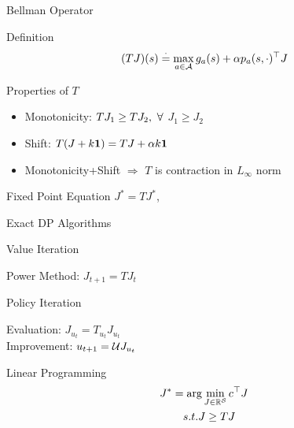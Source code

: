 \documentclass[10pt,handout]{beamer}
\begin{document}
\begin{frame}[fragile]{Bellman Operator}
\begin{block}{Definition}
\begin{align*}
(TJ)(s)&\stackrel{\cdot}{=}\max_{a\in \mathcal{A}} g_a(s)+\alpha p_a(s,\cdot)^\top J\\
\end{align*}
\end{block}
\begin{block}{Properties of $T$}
\begin{itemize}
\item {Monotonicity:} $T J_1\geq T J_2, \mbox{ } \forall$ $J_1\geq J_2$
\item {Shift:} $T (J+k\mathbf{1})= T J+\alpha k\mathbf{1}$
\item Monotonicity+Shift $\Rightarrow$ $T$ is contraction in $L_\infty$ norm
\end{itemize}
\end{block}
\begin{block}{Fixed Point Equation}
\centering $J^*=TJ^*$, %
\end{block}
\end{frame}


\begin{frame}[fragile]{Exact DP Algorithms}
\begin{block}{Value Iteration}
\begin{center}
Power Method: $J_{t+1}=T J_t$
\end{center}
\end{block}
\begin{block}{Policy Iteration}
\begin{center}
Evaluation: $J_{u_t}=T_{u_t} J_{u_t}$\\
Improvement: $u_{t+1}=\mathcal{U} J_{u_t}$
\end{center}
\end{block}

\begin{block}{Linear Programming}
\begin{align*}
J^*&=\arg\min_{J\in \mathbb{R}^{\mathcal{S}}} c^\top J\\
&\quad s.t. J\geq TJ
\end{align*}
\end{block}

\begin{center}
{\color{orange}{Convergent and Exact}}
\end{center}
\end{frame}
\end{document}
